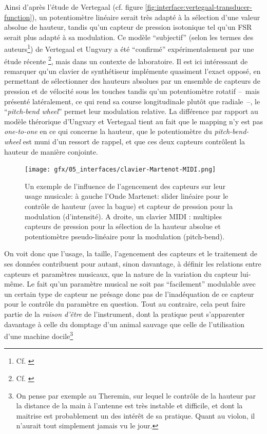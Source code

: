 \indent Ainsi d'après l'étude de Vertegaal (cf. figure \ref{fig:interface:vertegaal-transducer-function}), un potentiomètre linéaire serait très adapté à la sélection d'une valeur absolue de hauteur, tandis qu'un capteur de pression isotonique tel qu'un \gls{FSR} serait plus adapté à sa modulation. Ce modèle ``subjectif'' (selon les termes des auteurs\footnote{Cf. \cite{ungvary_cognition_1999}}) de Vertegaal et Ungvary a été ``confirmé'' expérimentalement par une étude récente \footnote{Cf. \cite{malloch_design_2019}}, mais dans un contexte de laboratoire. Il est ici intéressant de remarquer qu'un clavier de synthétiseur implémente quasiment l'exact opposé, en permettant de sélectionner des hauteurs absolues par un ensemble de capteurs de pression et de vélocité sous les touches tandis qu'un potentiomètre rotatif --~mais présenté latéralement, ce qui rend sa course longitudinale plutôt que radiale~--, le ``\textit{pitch-bend wheel}'' permet leur modulation relative. La différence par rapport au modèle thérorique d'Ungvary et Vertegaal tient au fait que le mapping n'y est pas \textit{one-to-one} en ce qui concerne la hauteur, que le potentiomètre du \textit{pitch-bend-wheel} est muni d'un ressort de rappel, et que ces deux capteurs contrôlent la hauteur de manière conjointe.\\
\begin{figure}[!htbp]
	\captionsetup{format=plain}%
	\texttt{[image: gfx/05\_interfaces/clavier-Martenot-MIDI.png]}
	\caption[Agencement des capteurs et fonction musicale]{Un exemple de l'influence de l'agencement des capteurs sur leur usage musicale: à gauche l'Onde Martenet: slider linéaire pour le contrôle de hauteur (avec la bague) et capteur de pression pour la modulation (d'intensité). A droite, un clavier MIDI : multiples capteurs de pression pour la sélection de la hauteur absolue et potentiomètre pseudo-linéaire pour la modulation (pitch-bend).}
	\label{fig:interface:martenot-clavier}
\end{figure}
\indent On voit donc que l'usage, la taille, l'agencement des capteurs et le traitement de ses données contribuent pour autant, sinon davantage, à définir les relations entre capteurs et paramètres musicaux, que la nature de la variation du capteur lui-même. Le fait qu'un paramètre musical ne soit pas ``facilement'' modulable avec un certain type de capteur ne présage donc pas de l'inadéquation de ce capteur pour le contrôle du paramètre en question. Tout au contraire, cela peut faire partie de la \textit{raison d'être} de l'instrument, dont la pratique peut s'apparenter davantage à celle du domptage d'un animal sauvage que celle de l'utilisation d'une machine docile\footnote{On pense par exemple au Theremin, sur lequel le contrôle de la hauteur par la distance de la main à l'antenne est très instable et difficile, et dont la maitrise est probablement un des intérêt de sa pratique. Quant au violon, il n'aurait tout simplement jamais vu le jour.}

